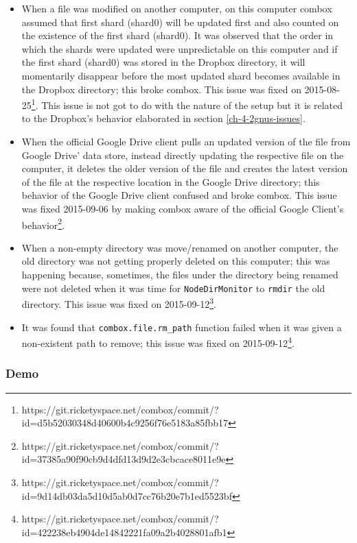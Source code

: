 \begin{itemize}
\item When a file was modified on another computer, on this computer
  combox assumed that first shard (shard0) will be updated first and
  also counted on the existence of the first shard (shard0). It was
  observed that the order in which the shards were updated were
  unpredictable on this computer and if the first shard (shard0) was
  stored in the Dropbox directory, it will momentarily disappear
  before the most updated shard becomes available in the Dropbox
  directory; this broke combox. This issue was fixed on
  2015-08-25\footnote{https://git.ricketyspace.net/combox/commit/?id=d5b52030348d40600b4c9256f76e5183a85fbb17}. This issue is not got to do with
  the nature of the setup but it is related to the Dropbox's behavior
  elaborated in section \ref{ch-4-2gnus-issues}.
\item When the official Google Drive client pulls an updated version
  of the file from Google Drive' data store, instead directly updating
  the respective file on the computer, it deletes the older version of
  the file and creates the latest version of the file at the
  respective location in the Google Drive directory; this behavior of
  the Google Drive client confused and broke combox. This issue was
  fixed 2015-09-06 by making combox aware of the official Google
  Client's
  behavior\footnote{https://git.ricketyspace.net/combox/commit/?id=37385a90f90cb9d4dfd13d9d2e3cbcace8011e9e}.
\item When a non-empty directory was move/renamed on another computer,
  the old directory was not getting properly deleted on this computer;
  this was happening because, sometimes, the files under the
  directory being renamed were not deleted when it was time for
  \verb+NodeDirMonitor+ to \verb+rmdir+ the old directory. This issue
  was fixed on
  2015-09-12\footnote{https://git.ricketyspace.net/combox/commit/?id=9d14db03da5d10d5ab0d7cc76b20e7b1ed5523bf}.
\item It was found that \verb+combox.file.rm_path+ function failed
  when it was given a non-existent path to remove; this issue was
  fixed on 2015-09-12\footnote{https://git.ricketyspace.net/combox/commit/?id=422238eb4904de14842221fa09a2b4028801afb1}.
\end{itemize}

\subsubsection{Demo}


